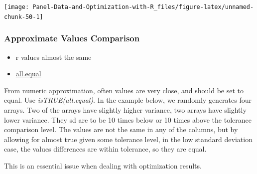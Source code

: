 \documentclass[
]{book}
\providecommand{\tightlist}{%
  \setlength{\itemsep}{0pt}\setlength{\parskip}{0pt}}
\begin{document}
\begin{center}\texttt{[image: Panel-Data-and-Optimization-with-R\_files/figure-latex/unnamed-chunk-50-1]} \end{center}

\hypertarget{approximate-values-comparison}{%
\subsubsection{Approximate Values Comparison}\label{approximate-values-comparison}}

\begin{itemize}
\tightlist
\item
  r values almost the same
\item
  \href{https://stat.ethz.ch/R-manual/R-patched/library/base/html/all.equal.html}{all.equal}
\end{itemize}

From numeric approximation, often values are very close, and should be set to equal. Use \emph{isTRUE(all.equal)}. In the example below, we randomly generates four arrays. Two of the arrays have slightly higher variance, two arrays have slightly lower variance. They sd are to be 10 times below or 10 times above the tolerance comparison level. The values are not the same in any of the columns, but by allowing for almost true given some tolerance level, in the low standard deviation case, the values differences are within tolerance, so they are equal.

This is an essential issue when dealing with optimization results.
\end{document}
